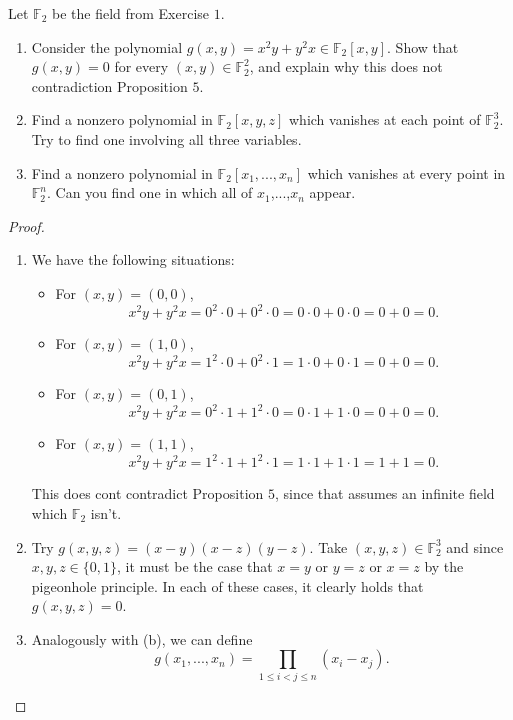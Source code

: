 \begin{exercise}{2}
Let $\mathbb{F}_2$ be the field from Exercise $1$.
\begin{enumerate}
    \item Consider the polynomial $g(x,y) = x^2 y + y^2 x\in \mathbb{F}_2[x,y]$. Show that $g(x,y) = 0$ for every $(x,y)\in \mathbb{F}_2^2$, and explain why this does not contradiction Proposition $5$.
    \item Find a nonzero polynomial in $\mathbb{F}_2[x,y,z]$ which vanishes at each point of $\mathbb{F}_2^3$. Try to find one involving all three variables.
    \item Find a nonzero polynomial in $\mathbb{F}_2[x_1,...,x_n]$ which vanishes at every point in $\mathbb{F}_2^n$. Can you find one in which all of $x_1$,...,$x_n$ appear.
\end{enumerate}
\end{exercise}
\begin{proof}
\begin{enumerate}
    \item We have the following situations:
    \begin{itemize}
        \item For $(x,y) = (0,0)$,
        $$x^2 y + y^2 x = 0^2\cdot 0 + 0^2 \cdot 0 = 0\cdot 0 + 0\cdot 0 = 0 + 0 = 0.$$
        \item For $(x,y) = (1,0)$,
        $$x^2 y + y^2 x = 1^2\cdot 0 + 0^2 \cdot 1 = 1\cdot 0 + 0\cdot 1 = 0 + 0 = 0.$$
        \item For $(x,y) = (0,1)$,
        $$x^2 y + y^2 x = 0^2\cdot 1 + 1^2 \cdot 0 = 0\cdot 1 + 1\cdot 0 = 0 + 0 = 0.$$
        \item For $(x,y) = (1,1)$,
        $$x^2 y + y^2 x = 1^2\cdot 1 + 1^2 \cdot 1 = 1\cdot 1 + 1\cdot 1 = 1 + 1 = 0.$$
    \end{itemize}
    This does cont contradict Proposition $5$, since that assumes an infinite field which $\mathbb{F}_2$ isn't.
    \item Try $g(x,y,z) = (x-y)(x-z)(y-z)$. Take $(x,y,z)\in \mathbb{F}_2^3$ and since $x,y,z\in \{0,1\}$, it must be the case that $x=y$ or $y=z$ or $x=z$ by the pigeonhole principle. In each of these cases, it clearly holds that $g(x,y,z) = 0$.
    \item Analogously with (b), we can define
    $$g(x_1,...,x_n) = \prod_{1\leq i<j\leq n} (x_i - x_j).$$
\end{enumerate}    
\end{proof}



